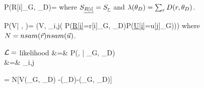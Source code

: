 \beq\color{blue}
P(R[i]\cond \theta_G, \theta_D)= 
\eeq
where $S_{\underline{R[i]}}=S_{\underline{r}}$ and  $\lambda(\theta_D)=\sum_r D(r, \theta_D)$.


\beq\color{blue}
P(V| \vecu,  \vecr)=
\delta(V, \ln \prod_{i,j}(
P(\ul{R[i]}=r[i]\cond \theta_G, \theta_D)P(\ul{U[i]}=u[j]\cond \theta_G)))
\eeq
where $N=nsam({\vec{r}})nsam({\vec{u}})$.


${\cal L}=$ likelihood
\beqa
\call&=&
P(\vecr, \vecu| \theta_G, \theta_D)\\
&=&
\prod_{i,j}
\eeqa

\beq
\ln \call = N[V(\theta_G, \theta_D)
-\ln \lam(\theta_D)-\ln \ol{\lam}(\theta_G, \theta_D)]
\eeq





 